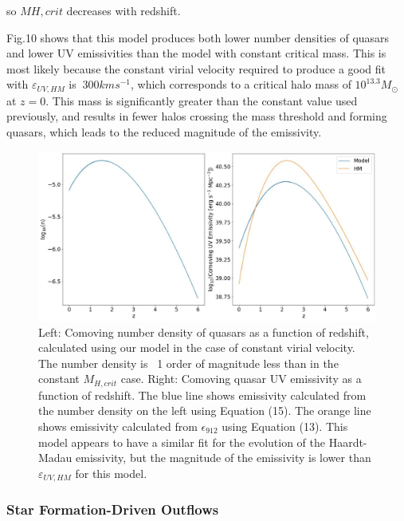 \documentclass[12pt, twocolumn]{report}%
\begin{document}
\noindent so $M{H,crit}$ decreases with redshift.\par

Fig.10 shows that this model produces both lower number densities of quasars and lower UV emissivities than the model with constant critical mass. This is most likely because the constant virial velocity required to produce a good fit with $\varepsilon_{UV,HM}$ is $~300kms^{-1}$, which corresponds to a critical halo mass of $10^{13.3}M_\odot$ at $z=0$. This mass is significantly greater than the constant value used previously, and results in fewer halos crossing the mass threshold and forming quasars, which leads to the reduced magnitude of the emissivity.

\onecolumngrid


\begin{figure}[H]
\centering
\includegraphics[width=\linewidth]{Plot_10_2.jpeg}
\caption{Left: Comoving number density of quasars as a function of redshift, calculated using our model in the case of constant virial velocity. The number density is ~1 order of magnitude less than in the constant $M_{H,crit}$ case. Right: Comoving quasar UV emissivity as a function of redshift. The blue line shows emissivity calculated from the number density on the left using Equation (15). The orange line shows emissivity calculated from $\epsilon_{912}$ using Equation (13). This model appears to have a similar fit for the evolution of the Haardt-Madau emissivity, but the magnitude of the emissivity is lower than $\varepsilon_{UV,HM}$ for this model.}
\label{fig:10}
\end{figure}

\twocolumngrid


\subsubsection{Star Formation-Driven Outflows}
\end{document}
